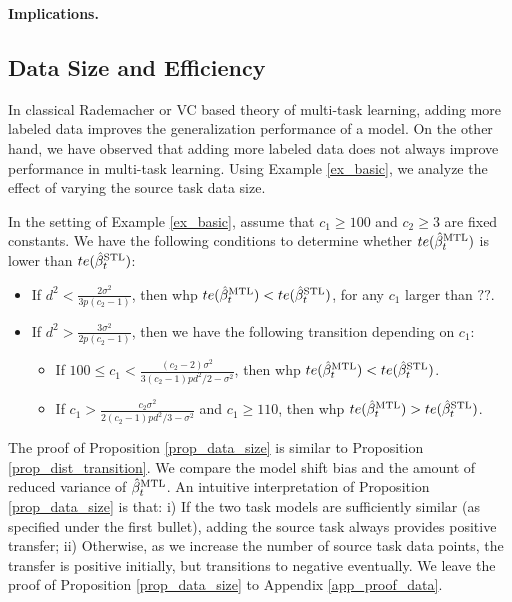 \textbf{Implications.} 

\subsection{Data Size and Efficiency}

In classical Rademacher or VC based theory of multi-task learning, adding more labeled data improves the generalization performance of a model.
On the other hand, we have observed that adding more labeled data does not always improve performance in multi-task learning.
Using Example \ref{ex_basic}, we analyze the effect of varying the source task data size.

\begin{proposition}\label{prop_data_size}
	In the setting of Example \ref{ex_basic}, assume that $c_1 \ge 100$ and $c_2  \ge 3$ are fixed constants.
	We have the following conditions to determine whether $te(\hat{\beta}_t^{\text{MTL}})$ is lower than $te(\hat{\beta}_t^{\text{STL}})$:
	\begin{itemize}
		\item If $d^2 < \frac{2\sigma^2}{3p (c_2 - 1)}$, then whp $te(\hat{\beta}_t^{\text{MTL}}) < te(\hat{\beta}_t^{\text{STL}})$, for any $c_1$ larger than $??$.
		\item If $d^2 > \frac{3\sigma^2}{2p (c_2 - 1)}$, then we have the following transition depending on $c_1$:
		\begin{itemize}
			\item If $100 \le c_1 < \frac{(c_2-2)\sigma^2}{3(c_2 - 1) pd^2/2 - \sigma^2}$, then whp $te(\hat{\beta}_t^{\text{MTL}}) < te(\hat{\beta}_t^{\text{STL}})$.
			\item If $c_1 > \frac{c_2 \sigma^2}{2(c_2 - 1)p d^2/3 - \sigma^2}$ and $c_1\ge 110$, then whp $te(\hat{\beta}_t^{\text{MTL}}) > te(\hat{\beta}_t^{\text{STL}})$.
		\end{itemize}
	\end{itemize}
\end{proposition}

The proof of Proposition \ref{prop_data_size} is similar to Proposition \ref{prop_dist_transition}.
We compare the model shift bias and the amount of reduced variance of $\hat{\beta}_t^{\text{MTL}}$.
An intuitive interpretation of Proposition \ref{prop_data_size} is that:
i) If the two task models are sufficiently similar (as specified under the first bullet), adding the source task always provides positive transfer;
ii) Otherwise, as we increase the number of source task data points, the transfer is positive initially, but transitions to negative eventually.
We leave the proof of Proposition \ref{prop_data_size} to Appendix \ref{app_proof_data}.

